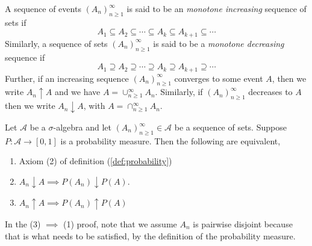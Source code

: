 \documentclass[../main.tex]{subfiles}
\begin{document}
\begin{definition}\label{def:Increasing or Decreasing Sequence of Sets}
A sequence of events $(A_n)^\infty_{n\geq 1}$ is said to be an \textit{monotone increasing} sequence of sets if \[
A_1 \subseteq A_2 \subseteq \cdots \subseteq A_k \subseteq A_{k+1} \subseteq \cdots
\]
Similarly, a sequence of sets $(A_n)^\infty_{n\geq 1}$ is said to be a \textit{monotone decreasing} sequence if \[
A_1 \supseteq A_2 \supseteq \cdots \supseteq A_k \supseteq A_{k+1} \supseteq \cdots
\]
Further, if an increasing sequence $(A_n)^\infty_{n\geq 1}$ converges to some event $A$, then we write $A_n \uparrow A$ and we have $A = \cup^\infty_{n\geq 1}{A_n}$. Similarly, 
if $(A_n)^\infty_{n\geq 1}$ decreases to $A$ then we write $A_n \downarrow A$, with  $A = \cap^\infty_{n\geq 1}{A_n}$.
\end{definition}












\begin{theorem}\label{thm:convergence of P of seq of sets}
Let $\mathcal{A}$ be a $\sigma$-algebra and let $(A_n)^\infty_{n\geq 1} \in \mathcal{A}$ be a sequence of sets. Suppose $P: \mathcal{A}\to [0,1]$ is a probability measure.
Then the following are equivalent, 
\begin{enumerate}
    \item Axiom (2) of definition (\ref{def:probability})
    \item $A_n \downarrow A \implies P(A_n) \downarrow P(A)$.
    \item $A_n \uparrow A \implies P(A_n) \uparrow P(A)$
\end{enumerate}
\end{theorem}


\begin{remark}
In the (3) $\implies$ (1) proof, note that we assume $A_n$ is pairwise disjoint
because that is what needs to be satisfied, by the definition of the probability measure.

\end{remark}
\end{document}
